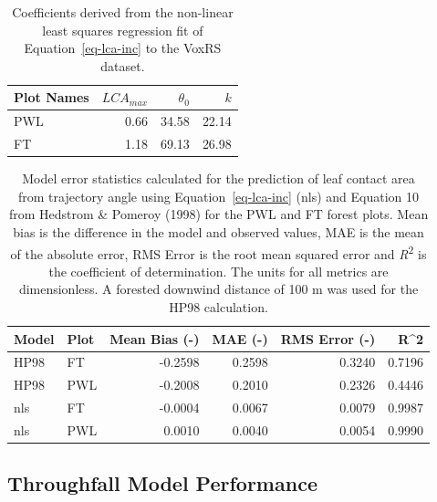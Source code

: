 \documentclass[
  letterpaper,
  DIV=11,
  numbers=noendperiod]{scrartcl}
\begin{document}
\begin{longtable}[]{@{}lrrr@{}}

\caption{\label{tbl-lca-coefs}Coefficients derived from the non-linear
least squares regression fit of Equation~\ref{eq-lca-inc} to the VoxRS
dataset.}

\tabularnewline

\toprule\noalign{}
Plot Names & \(LCA_{max}\) & \(\theta_0\) & \(k\) \\
\midrule\noalign{}
\endhead
\bottomrule\noalign{}
\endlastfoot
PWL & 0.66 & 34.58 & 22.14 \\
FT & 1.18 & 69.13 & 26.98 \\

\end{longtable}

\begin{longtable}[]{@{}llrrrr@{}}

\caption{\label{tbl-lca-mod-err}Model error statistics calculated for
the prediction of leaf contact area from trajectory angle using
Equation~\ref{eq-lca-inc} (nls) and Equation 10 from Hedstrom \& Pomeroy
(1998) for the PWL and FT forest plots. Mean bias is the difference in
the model and observed values, MAE is the mean of the absolute error,
RMS Error is the root mean squared error and \emph{R}\textsuperscript{2}
is the coefficient of determination. The units for all metrics are
dimensionless. A forested downwind distance of 100 m was used for the
HP98 calculation.}

\tabularnewline

\toprule\noalign{}
Model & Plot & Mean Bias (-) & MAE (-) & RMS Error (-) & R\^{}2 \\
\midrule\noalign{}
\endhead
\bottomrule\noalign{}
\endlastfoot
HP98 & FT & -0.2598 & 0.2598 & 0.3240 & 0.7196 \\
HP98 & PWL & -0.2008 & 0.2010 & 0.2326 & 0.4446 \\
nls & FT & -0.0004 & 0.0067 & 0.0079 & 0.9987 \\
nls & PWL & 0.0010 & 0.0040 & 0.0054 & 0.9990 \\

\end{longtable}

\subsection{Throughfall Model
Performance}\label{throughfall-model-performance}
\end{document}
